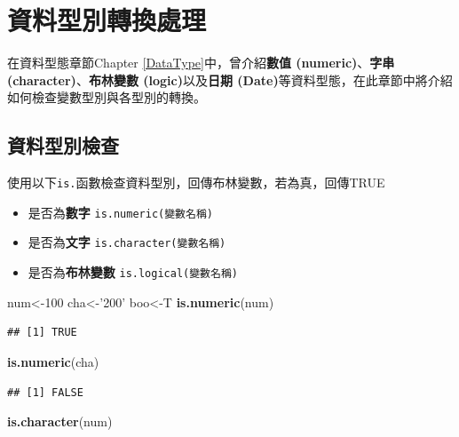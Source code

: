 \documentclass[]{book}
\newenvironment{Shaded}{\begin{snugshade}}{\end{snugshade}}
\newcommand{\KeywordTok}[1]{\textcolor[rgb]{0.13,0.29,0.53}{\textbf{{#1}}}}
\newcommand{\DecValTok}[1]{\textcolor[rgb]{0.00,0.00,0.81}{{#1}}}
\newcommand{\StringTok}[1]{\textcolor[rgb]{0.31,0.60,0.02}{{#1}}}
\newcommand{\NormalTok}[1]{{#1}}
\providecommand{\tightlist}{%
  \setlength{\itemsep}{0pt}\setlength{\parskip}{0pt}}
\theoremstyle{definition}
\theoremstyle{definition}
\theoremstyle{remark}
\begin{document}
\section{資料型別轉換處理}

在資料型態章節Chapter \ref{DataType}中，曾介紹\textbf{數值
(numeric)}、\textbf{字串 (character)}、\textbf{布林變數
(logic)}以及\textbf{日期
(Date)}等資料型態，在此章節中將介紹如何檢查變數型別與各型別的轉換。

\subsection{資料型別檢查}

使用以下\texttt{is.}函數檢查資料型別，回傳布林變數，若為真，回傳TRUE

\begin{itemize}
\tightlist
\item
  是否為\textbf{數字} \texttt{is.numeric(變數名稱)}
\item
  是否為\textbf{文字} \texttt{is.character(變數名稱)}
\item
  是否為\textbf{布林變數} \texttt{is.logical(變數名稱)}
\end{itemize}

\begin{Shaded}
\begin{Highlighting}[]
\NormalTok{num<-}\DecValTok{100}
\NormalTok{cha<-}\StringTok{'200'}
\NormalTok{boo<-T}
\KeywordTok{is.numeric}\NormalTok{(num)}
\end{Highlighting}
\end{Shaded}

\begin{verbatim}
## [1] TRUE
\end{verbatim}

\begin{Shaded}
\begin{Highlighting}[]
\KeywordTok{is.numeric}\NormalTok{(cha)}
\end{Highlighting}
\end{Shaded}

\begin{verbatim}
## [1] FALSE
\end{verbatim}

\begin{Shaded}
\begin{Highlighting}[]
\KeywordTok{is.character}\NormalTok{(num)}
\end{Highlighting}
\end{Shaded}
\end{document}
